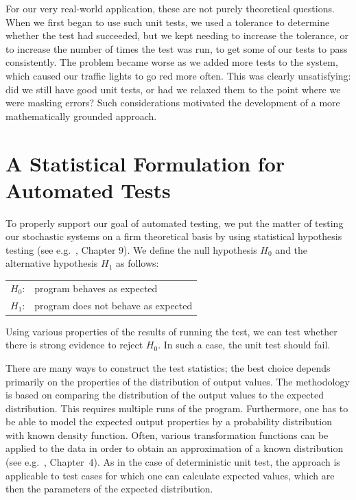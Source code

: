 \documentclass{sig-alternate-preprint}
\begin{document}
For our very real-world application, these are not purely theoretical
questions.  When we first began to use such unit tests, we used a tolerance
to determine whether the test had succeeded, but we kept needing to
increase the tolerance, or to increase the number of times the test was
run, to get some of our tests to pass consistently.  The problem became worse
as we added more tests to the system, which caused our traffic lights
to go red more often. This was clearly unsatisfying: did we still have
good unit tests, or had we relaxed them to the point where we were masking
errors?  Such considerations motivated the development of a more
mathematically grounded approach.

\section{A Statistical Formulation for Automated Tests}
\label{sec:statform}

To properly support our goal of automated testing, we put the matter
of testing our stochastic systems on a firm theoretical basis by using
statistical hypothesis testing (see e.g.\ \cite{mood-book-1974}, Chapter 9).
We define the null hypothesis $H_0$ and the alternative hypothesis
$H_1$ as follows:

\begin{tabular}{ll}
$H_0$: & program behaves as expected\\
$H_1$: & program does not behave as expected
\end{tabular}

Using various properties of the results of running the test, we can test
whether there is strong evidence to reject $H_0$. In such a case, the unit
test should fail.

There are many ways to construct the test statistics; the best choice depends
primarily on the properties of the distribution of output values.  The
methodology is based on comparing the distribution of the output values to the
expected distribution. This requires multiple runs of the program.
Furthermore, one has to be able to model the expected output properties by a
probability distribution with known density function. Often, various
transformation functions can be applied to the data in order to obtain an
approximation of a known distribution (see e.g.~\cite{Afifi&2004}, Chapter~4).
As in the case of deterministic unit test, the approach is applicable to test
cases for which one can calculate expected values, which are then the
parameters of the expected distribution.
\end{document}
